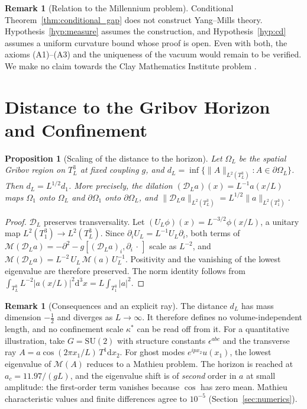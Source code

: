 \documentclass[11pt,a4paper]{amsart}
\newtheorem{proposition}[theorem]{Proposition}
\theoremstyle{definition}
\newtheorem{remark}[theorem]{Remark}
\newcommand{\diff}{\mathrm{d}}
\begin{document}
\begin{remark}[Relation to the Millennium problem]
\label{rem:not_clay_problem}
Conditional Theorem~\ref{thm:conditional_gap} does not construct Yang--Mills theory. Hypothesis~\ref{hyp:measure} assumes the construction, and Hypothesis~\ref{hyp:cd} assumes a uniform curvature bound whose proof is open. Even with both, the axioms (A1)--(A3) and the uniqueness of the vacuum would remain to be verified. We make no claim towards the Clay Mathematics Institute problem \cite{jaffe2006quantum}.
\end{remark}

\section{Distance to the Gribov Horizon and Confinement}
\label{sec:horizon}

\begin{proposition}[Scaling of the distance to the horizon]
\label{prop:horizon_scaling}
Let $\Omega_L$ be the spatial Gribov region on $T^3_L$ at fixed coupling $g$, and $d_L = \inf\{\|A\|_{L^2(T^3_L)} : A \in \partial\Omega_L\}$. Then $d_L = L^{1/2} d_1$. More precisely, the dilation $(\mathcal{D}_L a)(x) = L^{-1}a(x/L)$ maps $\Omega_1$ onto $\Omega_L$ and $\partial\Omega_1$ onto $\partial\Omega_L$, and $\|\mathcal{D}_L a\|_{L^2(T^3_L)} = L^{1/2}\|a\|_{L^2(T^3_1)}$.
\end{proposition}

\begin{proof}
$\mathcal{D}_L$ preserves transversality. Let $(U_L\phi)(x) = L^{-3/2}\phi(x/L)$, a unitary map $L^2(T^3_1) \to L^2(T^3_L)$. Since $\partial_i U_L = L^{-1}U_L\partial_i$, both terms of $\mathcal{M}(\mathcal{D}_L a) = -\partial^2 - g[(\mathcal{D}_L a)_i, \partial_i\,\cdot\,]$ scale as $L^{-2}$, and $\mathcal{M}(\mathcal{D}_L a) = L^{-2}\,U_L\,\mathcal{M}(a)\,U_L^{-1}$. Positivity and the vanishing of the lowest eigenvalue are therefore preserved. The norm identity follows from $\int_{T^3_L} L^{-2}|a(x/L)|^2 \diff^3x = L\int_{T^3_1}|a|^2$.
\end{proof}

\begin{remark}[Consequences and an explicit ray]
The distance $d_L$ has mass dimension $-\frac12$ and diverges as $L \to \infty$. It therefore defines no volume-independent length, and no confinement scale $\kappa^*$ can be read off from it. For a quantitative illustration, take $G = \mathrm{SU}(2)$ with structure constants $\epsilon^{abc}$ and the transverse ray $A = a\cos(2\pi x_1/L)\,T^1\diff x_2$. For ghost modes $e^{ipx_2}u(x_1)$, the lowest eigenvalue of $\mathcal{M}(A)$ reduces to a Mathieu problem. The horizon is reached at $a_c = 11.97/(gL)$, and the eigenvalue shift is of \emph{second} order in $a$ at small amplitude: the first-order term vanishes because $\cos$ has zero mean. Mathieu characteristic values and finite differences agree to $10^{-5}$ (Section~\ref{sec:numerics}).
\end{remark}
\end{document}
